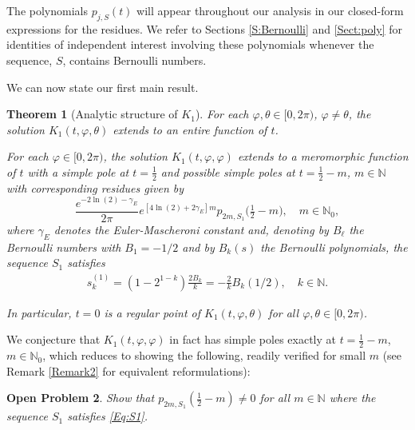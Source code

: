 \documentclass[letterpaper,10pt]{amsart}
\newtheorem{thm}{Theorem}[section]
\newtheorem{prob}[thm]{Open Problem}
\numberwithin{equation}{section}
\begin{document}
The polynomials $p_{j,S}(t)$ will appear throughout our analysis in our closed-form expressions for the residues. We refer to Sections \ref{S:Bernoulli} and \ref{Sect:poly} for identities  of independent interest involving these polynomials whenever the sequence, $S$, contains Bernoulli numbers.

We can now state our first main result.

\begin{thm}[Analytic structure of $K_1$]\label{Thm:Main3}
    For each $\varphi,\theta\in[0,2\pi)$, $\varphi\neq\theta$, the  solution $K_1(t,\varphi,\theta)$ extends to an entire function of $t$.

    For each $\varphi\in[0,2\pi)$, the solution $K_1(t,\varphi,\varphi)$ extends to a meromorphic function of $t$ with a simple pole at $t=\tfrac{1}{2}$ and  possible simple poles at $t=\frac{1}{2}-m$, $m\in\mathbb{N}$ with corresponding residues given by 
    \begin{equation}
        \frac{e^{-2\ln(2)-\gamma_E}}{2\pi}e^{[4\ln(2)+2\gamma_E] m}p_{2m,S_1}\big(\tfrac{1}{2}-m\big),\quad m\in\mathbb{N}_0,
    \end{equation}
    where $\gamma_E$ denotes the Euler-Mascheroni constant and, denoting by $B_\ell$ the Bernoulli numbers with $B_1=-1/2$ and by $B_k(s)$ the Bernoulli polynomials, the sequence $S_1$ satisfies
\begin{align}\label{Eq:S1}
s_k^{(1)}=(1-2^{1-k})\frac{2 B_{k}}{k}=-\frac{2}{k}B_k(1/2),\quad k\in\mathbb{N}.
\end{align} 

In particular, $t=0$ is a regular point of $K_1(t,\varphi,\theta)$ for all $\varphi,\theta\in[0,2\pi)$.
\end{thm}

We conjecture that $K_1(t,\varphi,\varphi)$ in fact has simple poles exactly at $t=\frac{1}{2}-m$, $m\in\mathbb{N}_0$, which reduces to showing the following, readily verified for small $m$ (see Remark \ref{Remark2} for equivalent reformulations):

\begin{prob}\label{Problem1}
Show that $p_{2m,S_1}(\tfrac{1}{2}-m)\neq0$ for all $m\in\mathbb{N}$ where the sequence $S_1$ satisfies \eqref{Eq:S1}. 
\end{prob}

\bigskip
\end{document}
